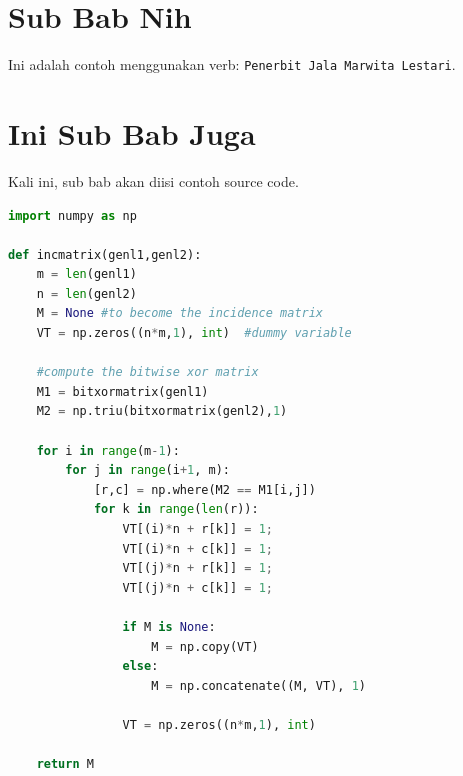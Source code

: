 \documentclass[oneside,a4paper,11pt,explicit]{book}
\begin{document}
\section{Sub Bab Nih}

Ini adalah contoh menggunakan verb: \verb|Penerbit Jala Marwita Lestari|. \lipsum[4]

\section{Ini Sub Bab Juga}

Kali ini, sub bab akan diisi contoh source code.

\begin{lstlisting}[language=Python, caption=Contoh Kode Sumber Python]
import numpy as np
    
def incmatrix(genl1,genl2):
    m = len(genl1)
    n = len(genl2)
    M = None #to become the incidence matrix
    VT = np.zeros((n*m,1), int)  #dummy variable
    
    #compute the bitwise xor matrix
    M1 = bitxormatrix(genl1)
    M2 = np.triu(bitxormatrix(genl2),1) 

    for i in range(m-1):
        for j in range(i+1, m):
            [r,c] = np.where(M2 == M1[i,j])
            for k in range(len(r)):
                VT[(i)*n + r[k]] = 1;
                VT[(i)*n + c[k]] = 1;
                VT[(j)*n + r[k]] = 1;
                VT[(j)*n + c[k]] = 1;
                
                if M is None:
                    M = np.copy(VT)
                else:
                    M = np.concatenate((M, VT), 1)
                
                VT = np.zeros((n*m,1), int)
    
    return M
\end{lstlisting}
\end{document}
